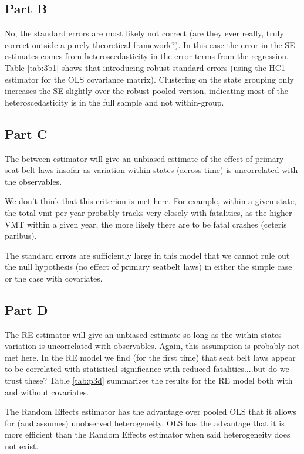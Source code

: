 \documentclass[letterpaper, 12pt]{article}
\begin{document}
\subsection{Part B}
No, the standard errors are most likely not correct (are they ever really, truly correct outside a purely theoretical framework?).  In this case the error in the SE estimates comes from heteroscedasticity in the error terms from the regression.  Table \ref{tab:3b1} shows that introducing robust standard errors (using the HC1 estimator for the OLS covariance matrix).  Clustering on the state grouping only increases the SE slightly over the robust pooled version, indicating most of the heteroscedasticity is in the full sample and not within-group.  




\subsection{Part C}
The between estimator will give an unbiased estimate of the effect of primary seat belt laws insofar as variation within states (across time) is uncorrelated with the observables.


We don't think that this criterion is met here. For example, within a given state, the total vmt per year probably tracks very closely with fatalities, as the higher VMT within a given year, the more likely there are to be fatal crashes (ceteris paribus).  


The standard errors are sufficiently large in this model that we cannot rule out the null hypothesis (no effect of primary seatbelt laws) in either the simple case or the case with covariates. 

\subsection{Part D}
The RE estimator will give an unbiased estimate so long as the within states variation is uncorrelated with observables. Again, this assumption is probably not met here.  In the RE model we find (for the first time) that seat belt laws appear to be correlated with statistical significance with reduced fatalities....but do we trust these?  Table \ref{tab:p3d} summarizes the results for the RE model both with and without covariates.  


The Random Effects estimator has the advantage over pooled OLS that it allows for (and assumes) unobserved heterogeneity. OLS has the advantage that it is more efficient than the Random Effects estimator when said heterogeneity does not exist.
\end{document}
